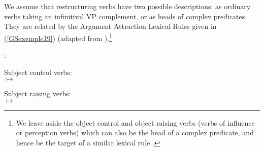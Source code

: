 	\label{GSexemple18b}
\zl

\noindent
We assume that restructuring verbs have two possible descriptions: as ordinary verbs taking an infinitival VP complement, or as heads of complex predicates. They are related by the Argument Attraction Lexical Rules given in (\ref{GSexemple19}) (adapted from \citealt[331]{Monachesi98a}).\footnote{We leave aside the object control and object raising verbs (verbs of influence or perception verbs) which can also be the head of a complex predicate, and hence be the target of a similar lexical rule \citep{AGMS98a, AG2010}.}  

\begin{exe}
:\label{GSexemple19} 
\begin{xlist}
\ex
\label{GSexemple19a}Subject control verbs:\\
		$\mapsto$ \\\smallskip
\begin{flushright}
\end{flushright}
\ex
\label{GSexemple19b}
Subject raising verbs:\\
		$\mapsto$ \\\smallskip
\flushright{}
\end{xlist}
\end{exe}

